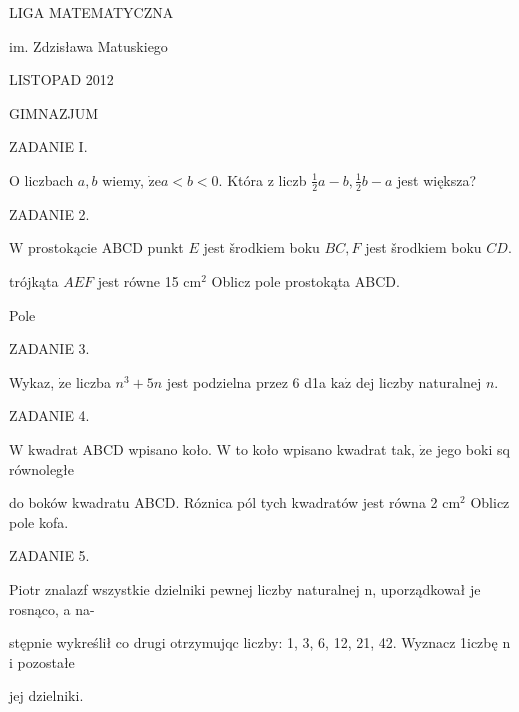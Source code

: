 \documentclass[a4paper,12pt]{article}
\begin{document}
LIGA MATEMATYCZNA

im. Zdzisława Matuskiego

LISTOPAD 2012

GIMNAZJUM

ZADANIE I.

$\mathrm{O}$ liczbach $a, b$ wiemy, $\dot{\mathrm{z}}\mathrm{e}a<b<0$. Która z liczb $\displaystyle \frac{1}{2}a-b, \displaystyle \frac{1}{2}b-a$ jest większa?

ZADANIE 2.

$\mathrm{W}$ prostokącie ABCD punkt $E$ jest šrodkiem boku $BC, F$ jest šrodkiem boku $CD.$

trójkąta $AEF$ jest równe 15 $\mathrm{c}\mathrm{m}^{2}$ Oblicz pole prostokąta ABCD.

Pole

ZADANIE 3.

Wykaz, $\dot{\mathrm{z}}\mathrm{e}$ liczba $n^{3}+5n$ jest podzielna przez 6 d1a $\mathrm{k}\mathrm{a}\dot{\mathrm{z}}$ dej liczby naturalnej $n.$

ZADANIE 4.

$\mathrm{W}$ kwadrat ABCD wpisano koło. $\mathrm{W}$ to koło wpisano kwadrat tak, $\dot{\mathrm{z}}\mathrm{e}$ jego boki sq równoległe

do boków kwadratu ABCD. Róznica pól tych kwadratów jest równa 2 $\mathrm{c}\mathrm{m}^{2}$ Oblicz pole kofa.

ZADANIE 5.

Piotr znalazf wszystkie dzielniki pewnej liczby naturalnej n, uporządkował je rosnąco, a na-

stępnie wykreślił co drugi otrzymujqc liczby: 1, 3, 6, 12, 21, 42. Wyznacz 1iczbę n i pozostałe

jej dzielniki.
\end{document}
